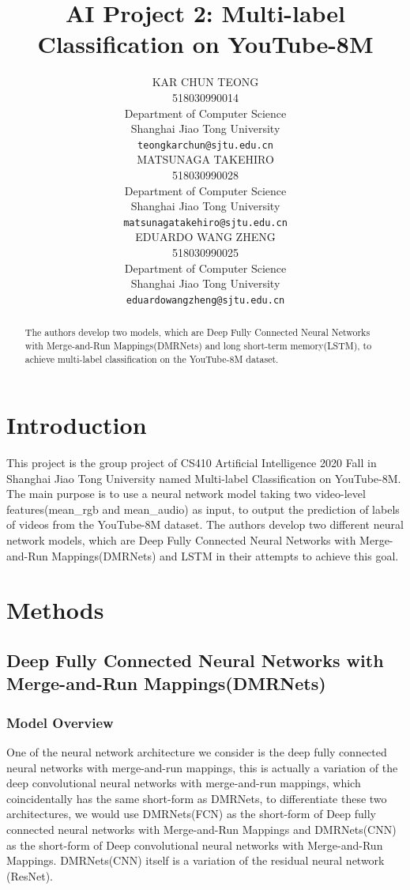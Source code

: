 \documentclass{article}
\title{AI Project 2: Multi-label Classification on YouTube-8M}
\author{
 KAR CHUN TEONG\\
518030990014\\
  Department of Computer Science\\
  Shanghai Jiao Tong University\\
  \texttt{teongkarchun@sjtu.edu.cn} \\
 \And
  MATSUNAGA TAKEHIRO \\
518030990028\\
	Department of Computer Science\\
  Shanghai Jiao Tong University\\
  \texttt{matsunagatakehiro@sjtu.edu.cn} \\
\And
  EDUARDO WANG ZHENG \\
	518030990025\\
	Department of Computer Science\\
  Shanghai Jiao Tong University\\
  \texttt{eduardowangzheng@sjtu.edu.cn} \\
}
\begin{document}
\maketitle

\begin{abstract}
  The authors develop two models, which are Deep Fully Connected Neural Networks with Merge-and-Run Mappings(DMRNets) and long short-term memory(LSTM), to achieve multi-label classification on the YouTube-8M dataset.
\end{abstract}

\section{Introduction}
This project is the group project of CS410 Artificial Intelligence 2020 Fall in Shanghai Jiao Tong University named Multi-label Classification on YouTube-8M. The main purpose is to use a neural network model taking two video-level features(mean\_rgb and mean\_audio) as input, to output the prediction of labels of videos from the YouTube-8M dataset. The authors develop two different neural network models, which are Deep Fully Connected Neural Networks with Merge-and-Run Mappings(DMRNets) and LSTM in their attempts to achieve this goal.

\section{Methods}
\subsection{Deep Fully Connected Neural Networks with Merge-and-Run Mappings(DMRNets)}
\subsubsection{Model Overview}
One of the neural network architecture we consider is the deep fully connected neural networks with merge-and-run mappings, this is actually a variation of the deep convolutional neural networks with merge-and-run mappings, which coincidentally has the same short-form as DMRNets, to differentiate these two architectures, we would use DMRNets(FCN) as the short-form of Deep fully connected neural networks with Merge-and-Run Mappings and DMRNets(CNN) as the short-form of Deep convolutional neural networks with Merge-and-Run Mappings. DMRNets(CNN) itself is a variation of the residual neural network (ResNet). 
\end{document}
